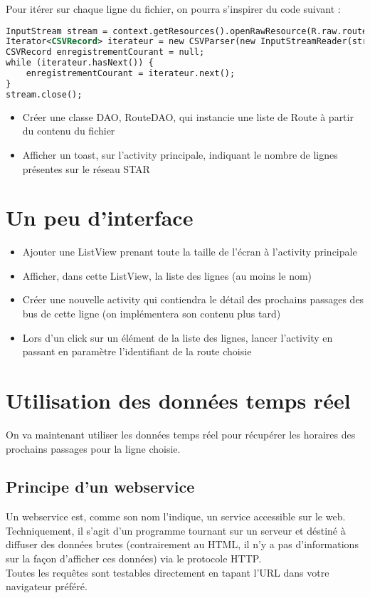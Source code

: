 \documentclass{article}
\begin{document}
Pour itérer sur chaque ligne du fichier, on pourra s'inspirer du code suivant
:\\
\begin{lstlisting}[language=XML]
InputStream stream = context.getResources().openRawResource(R.raw.routes);
Iterator<CSVRecord> iterateur = new CSVParser(new InputStreamReader(stream), CSVFormat.DEFAULT).iterator();
CSVRecord enregistrementCourant = null;
while (iterateur.hasNext()) {
    enregistrementCourant = iterateur.next();
}
stream.close();
\end{lstlisting}
\begin{itemize}
  \item Créer une classe DAO, RouteDAO, qui instancie une liste de Route à
  partir du contenu du fichier
  \item Afficher un toast, sur l'activity principale, indiquant le nombre de
  lignes présentes sur le réseau STAR
\end{itemize}
\section{Un peu d'interface}
\begin{itemize} 
  \item Ajouter une ListView prenant toute la taille de l'écran à l'activity
  principale
  \item Afficher, dans cette ListView, la liste des lignes (au moins le nom)
  \item Créer une nouvelle activity qui contiendra le détail des prochains
  passages des bus de cette ligne (on implémentera son contenu plus tard)
  \item Lors d'un click sur un élément de la liste des lignes, lancer l'activity
  en passant en paramètre l'identifiant de la route choisie
\end{itemize}
\section{Utilisation des données temps réel}
On va maintenant utiliser les données temps réel pour récupérer les horaires des
prochains passages pour la ligne choisie.
\subsection{Principe d'un webservice}
Un webservice est, comme son nom l'indique, un service accessible sur le web.\\
Techniquement, il s'agit d'un programme tournant sur un serveur et déstiné à
diffuser des données brutes (contrairement au HTML, il n'y a pas d'informations
sur la façon d'afficher ces données) via le protocole HTTP.\\
Toutes les requêtes sont testables directement en tapant l'URL dans votre
navigateur préféré.
\end{document}
